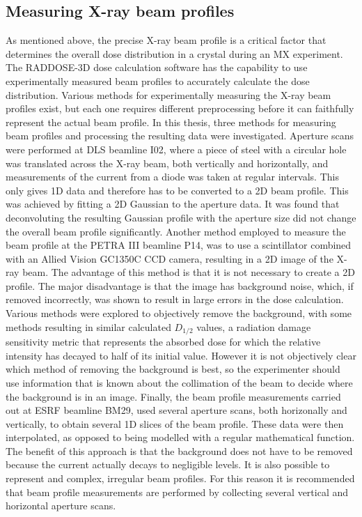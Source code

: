 \subsection{Measuring X-ray beam profiles}
\label{sub:Measuring X-ray Beam profiles}
As mentioned above, the precise X-ray beam profile is a critical factor that determines the overall dose distribution in a crystal during an MX experiment.
The RADDOSE-3D dose calculation software has the capability to use experimentally measured beam profiles to accurately calculate the dose distribution.
Various methods for experimentally measuring the X-ray beam profiles exist, but each one requires different preprocessing before it can faithfully represent the actual beam profile.
In this thesis, three methods for measuring beam profiles and processing the resulting data were investigated.
Aperture scans were performed at DLS beamline I02, where a piece of steel with a circular hole was translated across the X-ray beam, both vertically and horizontally, and measurements of the current from a diode was taken at regular intervals.
This only gives 1D data and therefore has to be converted to a 2D beam profile.
This was achieved by fitting a 2D Gaussian to the aperture data.
It was found that deconvoluting the resulting Gaussian profile with the aperture size did not change the overall beam profile significantly.
Another method employed to measure the beam profile at the PETRA III beamline P14, was to use a scintillator combined with an Allied Vision GC1350C CCD camera, resulting in a 2D image of the X-ray beam.
The advantage of this method is that it is not necessary to create a 2D profile.
The major disadvantage is that the image has background noise, which, if removed incorrectly, was shown to result in large errors in the dose calculation.
Various methods were explored to objectively remove the background, with some methods resulting in similar calculated $D_{1/2}$ values, a radiation damage sensitivity metric that represents the absorbed dose for which the relative intensity has decayed to half of its initial value.
However it is not objectively clear which method of removing the background is best, so the experimenter should use information that is known about the collimation of the beam to decide where the background is in an image.
Finally, the beam profile measurements carried out at ESRF beamline BM29, used several aperture scans, both horizonally and vertically, to obtain several 1D slices of the beam profile.
These data were then interpolated, as opposed to being modelled with a regular mathematical function.
The benefit of this approach is that the background does not have to be removed because the current actually decays to negligible levels.
It is also possible to represent and complex, irregular beam profiles.
For this reason it is recommended that beam profile measurements are performed by collecting several vertical and horizontal aperture scans.


